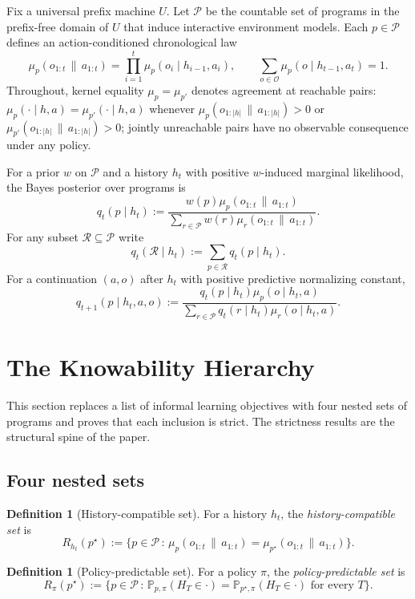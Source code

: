 \documentclass[11pt]{article}
\theoremstyle{definition}
\newtheorem{definition}[theorem]{Definition}
\theoremstyle{remark}
\newcommand{\Ocal}{\mathcal{O}}
\newcommand{\Pcal}{\mathcal{P}}
\newcommand{\Rcal}{\mathcal{R}}
\newcommand{\Prob}{\mathbb{P}}
\newcommand{\givena}{\,\|\,}
\begin{document}
Fix a universal prefix machine $U$. Let $\Pcal$ be the countable set of programs in the prefix-free domain of $U$ that induce interactive environment models. Each $p\in\Pcal$ defines an action-conditioned chronological law
\[
\mu_p(o_{1:t}\givena a_{1:t})
=
\prod_{i=1}^{t}\mu_p(o_i\mid h_{i-1},a_i),
\qquad
\sum_{o\in\Ocal}\mu_p(o\mid h_{t-1},a_t)=1.
\]
Throughout, kernel equality $\mu_p=\mu_{p'}$ denotes agreement at reachable pairs: $\mu_p(\cdot\mid h,a)=\mu_{p'}(\cdot\mid h,a)$ whenever $\mu_p(o_{1:|h|}\givena a_{1:|h|})>0$ or $\mu_{p'}(o_{1:|h|}\givena a_{1:|h|})>0$; jointly unreachable pairs have no observable consequence under any policy.

For a prior $w$ on $\Pcal$ and a history $h_t$ with positive $w$-induced marginal likelihood, the Bayes posterior over programs is
\[
q_t(p\mid h_t)
:=
\frac{w(p)\mu_p(o_{1:t}\givena a_{1:t})}
{\sum_{r\in\Pcal} w(r)\mu_r(o_{1:t}\givena a_{1:t})}.
\]
For any subset $\Rcal\subseteq\Pcal$ write
\[
q_t(\Rcal\mid h_t):=\sum_{p\in\Rcal} q_t(p\mid h_t).
\]
For a continuation $(a,o)$ after $h_t$ with positive predictive normalizing constant,
\[
q_{t+1}(p\mid h_t,a,o)
:=
\frac{q_t(p\mid h_t)\mu_p(o\mid h_t,a)}
{\sum_{r\in\Pcal} q_t(r\mid h_t)\mu_r(o\mid h_t,a)}.
\]

\section{The Knowability Hierarchy}
\label{sec:hierarchy}

This section replaces a list of informal learning objectives with four nested sets of programs and proves that each inclusion is strict. The strictness results are the structural spine of the paper.

\subsection{Four nested sets}

\begin{definition}[History-compatible set]
\label{def:history-compat}
For a history $h_t$, the \emph{history-compatible set} is
\[
R_{h_t}(p^\star)
:=
\bigl\{p\in\Pcal\,:\,\mu_p(o_{1:t}\givena a_{1:t})=\mu_{p^\star}(o_{1:t}\givena a_{1:t})\bigr\}.
\]
\end{definition}

\begin{definition}[Policy-predictable set]
\label{def:policy-pred}
For a policy $\pi$, the \emph{policy-predictable set} is
\[
R_\pi(p^\star)
:=
\bigl\{p\in\Pcal\,:\,\Prob_{p,\pi}(H_T\in\cdot)=\Prob_{p^\star,\pi}(H_T\in\cdot)\text{ for every }T\bigr\}.
\]
\end{definition}
\end{document}
